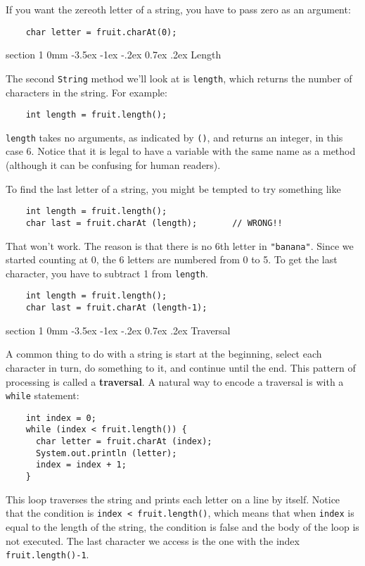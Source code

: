 \documentclass{book}
\makeatletter
\renewcommand{\section}{\@startsection 
    {section} {1} {0mm}%
    {-3.5ex \@plus -1ex \@minus -.2ex}%
    {0.7ex \@plus.2ex}%
    {\normalfont\Large\bfseries}}
\makeatother
\begin{document}
If you want the zereoth letter of a string, you have to pass
zero as an argument:

\begin{verbatim}
    char letter = fruit.charAt(0);
\end{verbatim}

\section{Length}

The second {\tt String} method we'll look at is {\tt length}, which
returns the number of characters in the string.  For example:

\begin{verbatim}
    int length = fruit.length();
\end{verbatim}
%
{\tt length} takes no arguments, as indicated by {\tt ()},
and returns an integer, in this case 6.  Notice that it is
legal to have a variable with the same name as a method (although
it can be confusing for human readers).

To find the last letter of a string, you might be tempted to
try something like

\begin{verbatim}
    int length = fruit.length();
    char last = fruit.charAt (length);       // WRONG!!
\end{verbatim}
%
That won't work.  The reason is that there is no 6th letter
in {\tt "banana"}.  Since we started counting at 0, the 6
letters are numbered from 0 to 5.  To get the last character,
you have to subtract 1 from {\tt length}.

\begin{verbatim}
    int length = fruit.length();
    char last = fruit.charAt (length-1);
\end{verbatim}


\section{Traversal}
\label{traverse}

A common thing to do with a string is
start at the beginning, select each character in turn, do
something to it, and continue until the end.  This pattern
of processing is called a {\bf traversal}.  A natural
way to encode a traversal is with a {\tt while} statement:

\begin{verbatim}
    int index = 0;
    while (index < fruit.length()) {
      char letter = fruit.charAt (index);
      System.out.println (letter);
      index = index + 1;
    }
\end{verbatim}
%
This loop traverses the string and prints each letter on
a line by itself.  Notice that the condition is
{\tt index < fruit.length()}, which means that when
{\tt index} is equal to the length of the string, the
condition is false and the body of the loop is not executed.
The last character we access is the one with the
index {\tt fruit.length()-1}.
\end{document}
